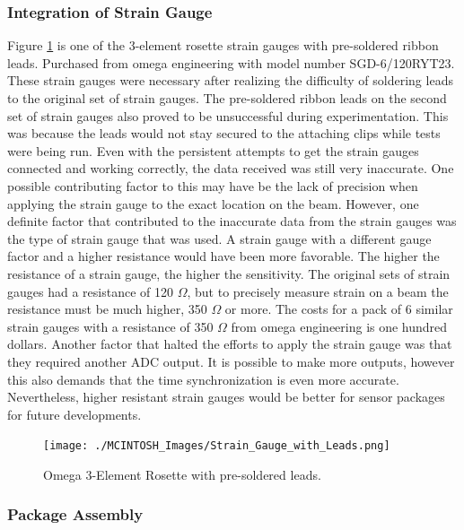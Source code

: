 
\subsubsection{Integration of Strain Gauge}

\indent Figure \ref{fig:OmegaSoldered} is one of the 3-element rosette strain gauges with pre-soldered ribbon leads. Purchased from omega engineering with
model number SGD-6/120RYT23. These strain gauges were necessary after realizing the difficulty of soldering leads to the original set of strain gauges.
The pre-soldered ribbon leads on the second set of strain gauges also proved to be unsuccessful during experimentation. This was because the leads would
not stay secured to the attaching clips while tests were being run. Even with the persistent attempts to get the strain gauges connected and working
correctly, the data received was still very inaccurate. One possible contributing factor to this may have be the lack of precision when applying the
strain gauge to the exact location on the beam. However, one definite factor that contributed to the inaccurate data from the strain gauges was the
type of strain gauge that was used. A strain gauge with a different gauge factor and a higher resistance would have been more favorable. The higher
the resistance of a strain gauge, the higher the sensitivity. The original sets of strain gauges had a resistance of 120 $\Omega$, but to precisely
measure strain on a beam the resistance must be much higher, 350 $\Omega$ or more. The costs for a pack of 6 similar strain gauges with a
resistance of 350 $\Omega$ from omega engineering is one hundred dollars. Another factor that halted the efforts to apply the strain gauge was
that they required another ADC output. It is possible to make more outputs, however this also demands that the time synchronization is even more
accurate. Nevertheless, higher resistant strain gauges would be better for sensor packages for future developments. \\

\begin{figure}[h!]
\centering
\texttt{[image: ./MCINTOSH\_Images/Strain\_Gauge\_with\_Leads.png]}
\caption{Omega 3-Element Rosette with pre-soldered leads.}
\label{fig:OmegaSoldered}
\end{figure}

\subsubsection{Package Assembly}


